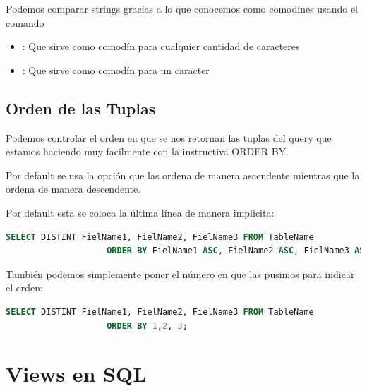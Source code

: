 \documentclass[12pt, fleqn]{report}                             %
\newcommand \Quote {\qq}                                        %
\begin{document}
            Podemos comparar strings gracias a lo que conocemos como comodínes usando
            el comando \Quote{LIKE}
            \begin{itemize}
                \item \Quote{\%}: Que sirve como comodín para cualquier cantidad de caracteres 
                \item \Quote{\_}: Que sirve como comodín para un caracter 
            \end{itemize}


        \section{Orden de las Tuplas}

            Podemos controlar el orden en que se nos retornan las tuplas del query que estamos
            haciendo muy facilmente con la instructiva ORDER BY.

            Por default se usa la opción \Quote{ASC} que las ordena de manera ascendente
            mientras que \Quote{DESC} la ordena de manera descendente.

            Por default esta se coloca la última línea de manera implicita:
            \begin{lstlisting}[language=SQL, gobble=16]
                SELECT DISTINT FielName1, FielName2, FielName3 FROM TableName
                    ORDER BY FielName1 ASC, FielName2 ASC, FielName3 ASC;
            \end{lstlisting}

            También podemos simplemente poner el número en que las pusimos para 
            indicar el orden:

            \begin{lstlisting}[language=SQL, gobble=16]
                SELECT DISTINT FielName1, FielName2, FielName3 FROM TableName
                    ORDER BY 1,2, 3;
            \end{lstlisting}


    \chapter{Views en SQL}
\end{document}
